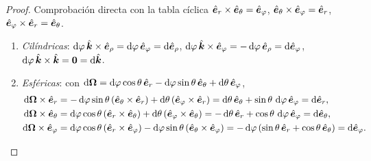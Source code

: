 \begin{proof}
Comprobación directa con la tabla cíclica $\er\times\et=\ef$,
$\et\times\ef=\er$, $\ef\times\er=\et$.
\begin{enumerate}
  \item \emph{Cilíndricas}: $\dd\varphi\,\kk\times\erho=\dd\varphi\,\ef=\dd\erho$,
  $\dd\varphi\,\kk\times\ef=-\dd\varphi\,\erho=\dd\ef$, $\dd\varphi\,\kk\times\kk=\vb{0}=\dd\kk$.
  \item \emph{Esféricas}: con
  $\dd\vb{\Omega}=\dd\varphi\cos\theta\,\er-\dd\varphi\sin\theta\,\et+\dd\theta\,\ef$,
  \begin{align*}
    \dd\vb{\Omega}\times\er&=-\dd\varphi\sin\theta\,(\et\times\er)+\dd\theta\,(\ef\times\er)
    =\dd\theta\,\et+\sin\theta\,\dd\varphi\,\ef=\dd\er,\\
    \dd\vb{\Omega}\times\et&=\dd\varphi\cos\theta\,(\er\times\et)+\dd\theta\,(\ef\times\et)
    =-\dd\theta\,\er+\cos\theta\,\dd\varphi\,\ef=\dd\et,\\
    \dd\vb{\Omega}\times\ef&=\dd\varphi\cos\theta\,(\er\times\ef)-\dd\varphi\sin\theta\,(\et\times\ef)
    =-\dd\varphi\,(\sin\theta\,\er+\cos\theta\,\et)=\dd\ef.\qedhere
  \end{align*}
\end{enumerate}
\end{proof}

